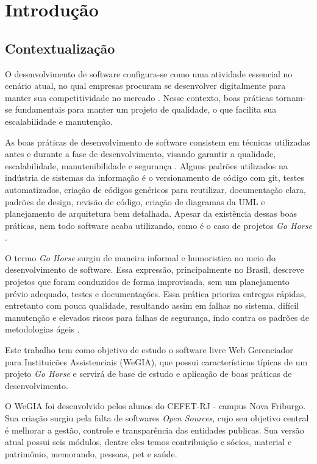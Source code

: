 \chapter{Introdução}
\label{sec:introducao}

    \section{Contextualização}
	
	O desenvolvimento de software configura-se como uma atividade essencial no cenário atual, no qual empresas procuram se desenvolver digitalmente para manter sua competitividade no mercado \cite[]{cardoso2019and}. Nesse contexto, boas práticas tornam-se fundamentais para manter um projeto de qualidade, o que facilita sua escalabilidade e manutenção. 

    As boas práticas de desenvolvimento de software consistem em técnicas utilizadas antes e durante  a fase de desenvolvimento, visando garantir a qualidade, escalabilidade, manutenibilidade e segurança \cite[]{braga2007visao}. Alguns padrões utilizados na indústria de sistemas da informação é o versionamento de código com git, testes automatizados, criação de códigos genéricos para reutilizar, documentação clara, padrões de design, revisão de código, criação de diagramas da UML e planejamento de arquitetura bem detalhada. Apesar da existência dessas boas práticas, nem todo software acaba utilizando, como é o caso de projetos \textit{Go Horse} \cite[]{sturmaplicaccao}.

    O termo \textit{Go Horse} surgiu de maneira informal e humoristica no meio do desenvolvimento de software. Essa expressão, principalmente no Brasil, descreve projetos que foram conduzidos de forma improvisada, sem um planejamento prévio adequado, testes e documentações. Essa prática prioriza entregas rápidas, entretanto com pouca qualidade, resultando assim em falhas no sistema, difícil manutenção e elevados riscos para falhas de segurança, indo contra os padrões de metodologias ágeis \cite[]{perry2016funccao}. 

    Este trabalho tem como objetivo de estudo o software livre Web Gerenciador para Instituicões Assistenciais (WeGIA), que possui características típicas de um projeto \textit{Go Horse} e servirá de base de estudo e aplicação de boas práticas de desenvolvimento.
    
    O WeGIA foi desenvolvido pelos alunos do CEFET-RJ - campus Nova Friburgo. Sua criação surgiu pela falta de softwares \textit{Open Sources}, cujo seu objetivo central é melhorar a gestão, controle e transparência das entidades publicas. Sua versão atual possui seis módulos, dentre eles temos contribuição e sócios, material e patrimônio, memorando, pessoas, pet e saúde. \cite[]{latinoware2024wegia}
    
